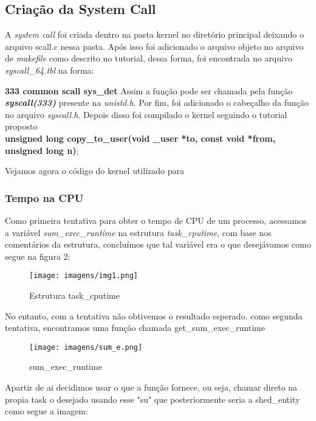\documentclass[12pt]{article}
\begin{document}
\subsection*{Criação da System Call}
A \textit{system call} foi criada dentro na pasta kernel no diretório principal deixando o arquivo  scall.c nessa pasta. Após isso foi adicionado o arquivo objeto no arquivo de \textit{makefile} como descrito no tutorial, dessa forma, foi encontrada no arquivo \textit{syscall\_64.tbl} na forma: \newline

\textbf{333	common	scall			sys\_det}
\newline
Assim a função pode ser chamada pela função \textit{\textbf{syscall(333)}} presente na \textit{unistd.h}. Por fim, foi adicionado o cabeçalho da função no arquivo \textit{syscall.h}. Depois disso foi compilado o kernel seguindo o tutorial proposto  %
\\ \newline
\scriptsize{\textbf{unsigned long copy\_to\_user(void \_user *to, const void *from, unsigned long n)};}
\newline
	
Vejamos agora o código do kernel utilizado para

\subsubsection*{Tempo na CPU}
Como primeira tentativa para obter o tempo de CPU de um processo, acessamos a variável \textit{sum\_exec\_runtime} na estrutura \textit{task\_cputime}, com base nos comentários da estrutura, concluímos que tal variável era o que desejávamos como segue na figura 2: %

\begin{figure}[!h]
	\centering
	\texttt{[image: imagens/img1.png]}
	\caption{Estrutura task\_cputime}
	\label{taskcputime}
\end{figure}
	No entanto, com a tentativa não obtivemos o resultado esperado.
como segunda tentativa, encontramos uma função chamada get\_sum\_exec\_runtime

\begin{figure}[!h]
	\centering
\texttt{[image: imagens/sum\_e.png]} 
	\caption{sum\_exec\_runtime}
	\label{decschedentity}
\end{figure}

 Apartir de ai decidimos usar o que a função fornece, ou seja, chamar direto na propia task o desejado usando esse "su" que posteriormente seria a shed\_entity como segue a imagem:
 
\end{document}
